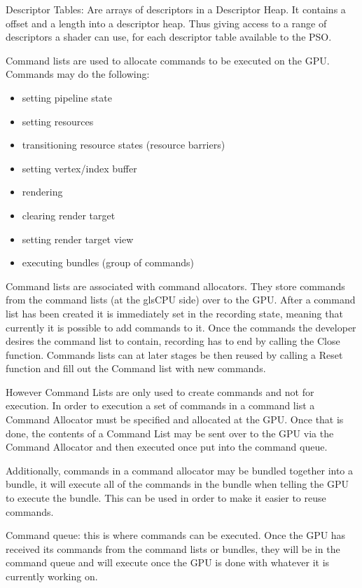 Descriptor Tables:
Are arrays of descriptors in a Descriptor Heap.
It contains a offset and a length into a descriptor heap.
Thus giving access to a range of descriptors a shader can use, for each descriptor table available to the \gls{PSO}.

Command lists are used to allocate commands to be executed on the \gls{GPU}. Commands may do the following:
\begin{itemize}
\item setting pipeline state
\item setting resources
\item transitioning resource states (resource barriers)
\item setting vertex/index buffer
\item rendering
\item clearing render target
\item setting render target view
\item executing bundles (group of commands)
\end{itemize}

Command lists are associated with command allocators.
They store commands from the command lists (at the gls{CPU} side) over to the \gls{GPU}.
After a command list has been created it is immediately set in the recording state, meaning that currently it is possible to add commands to it.
Once the commands the developer desires the command list to contain, recording has to end by calling the Close function. 
Commands lists can at later stages be then reused by calling a Reset function and fill out the Command list with new commands. 


However Command Lists are only used to create commands and not for execution.
In order to execution a set of commands in a command list a Command Allocator must be specified and allocated at the GPU.
Once that is done, the contents of a Command List may be sent over to the GPU via the Command Allocator and then executed once put into the command queue.

Additionally, commands in a command allocator may be bundled together into a bundle, it will execute all of the commands in the bundle when telling the GPU to execute the bundle. This can be used in order to make it easier to reuse commands.


Command queue: this is where commands can be executed. Once the GPU has received its commands from the command lists or bundles, they will be in the command queue and will execute once the GPU is done with whatever it is currently working on. 


